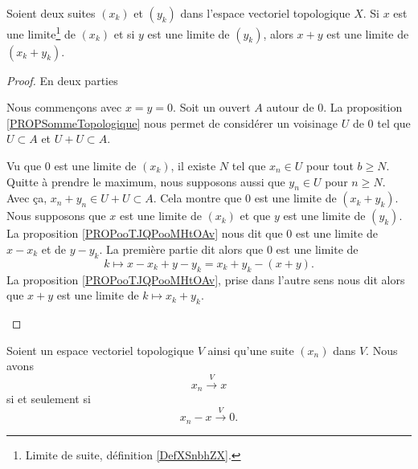 \begin{proposition}		\label{PROPooQIQSooHbNkIy}
	Soient deux suites \( (x_k)\) et \( (y_k)\) dans l'espace vectoriel topologique \( X\). Si \( x\) est une limite\footnote{Limite de suite, définition \ref{DefXSnbhZX}.} de \( (x_k)\) et si \( y\) est une limite de \( (y_k)\), alors \( x+y\) est une limite de \( (x_k+y_k)\).
\end{proposition}

\begin{proof}
	En deux parties
	\begin{subproof}
		\spitem[Le cas \( x=y=0\)]
		Nous commençons avec \( x=y=0\). Soit un ouvert \( A\) autour de \( 0\). La proposition \ref{PROPSommeTopologique} nous permet de considérer un voisinage \( U\) de \( 0\) tel que \( U\subset A\) et \( U+U\subset A\).

		Vu que \( 0\) est une limite de \( (x_k)\), il existe \( N\) tel que \( x_n\in U\) pour tout \( b\geq N\). Quitte à prendre le maximum, nous supposons aussi que \( y_n\in U\) pour \( n\geq N\). Avec ça, \( x_n+y_n\in U+U\subset A\). Cela montre que \( 0\) est une limite de \( (x_k+y_k)\).
		Nous supposons que \( x\) est une limite de \( (x_k)\) et que \( y\) est une limite de \( (y_k)\). La proposition \ref{PROPooTJQPooMHtOAv} nous dit que \( 0\) est une limite de \( x-x_k\) et de \( y-y_k\). La première partie dit alors que \( 0\) est une limite de
		\begin{equation}
			k\mapsto x-x_k+y-y_k=x_k+y_k-(x+y).
		\end{equation}
		La proposition \ref{PROPooTJQPooMHtOAv}, prise dans l'autre sens nous dit alors que \( x+y\) est une limite de \( k\mapsto x_k+y_k\).
	\end{subproof}
\end{proof}




\begin{lemma}       \label{LEMooJDJVooHUKdSe}
	Soient un espace vectoriel topologique \( V\) ainsi qu'une suite \( (x_n)\) dans \( V\). Nous avons
	\begin{equation}
		x_n\stackrel{V}{\longrightarrow}x
	\end{equation}
	si et seulement si
	\begin{equation}
		x_n-x\stackrel{V}{\longrightarrow}0.
	\end{equation}
\end{lemma}

